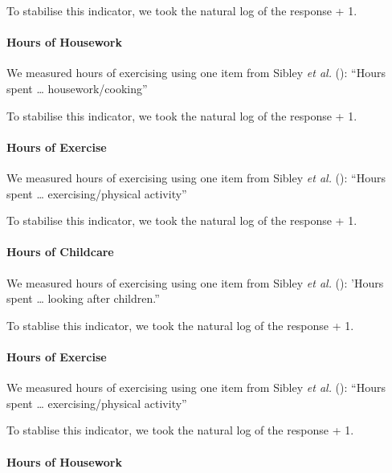\documentclass[
  singlecolumn]{article}
\let\oldparagraph\paragraph
\renewcommand{\paragraph}[1]{\oldparagraph{#1}\mbox{}}
\begin{document}
To stabilise this indicator, we took the natural log of the response +
1.

\paragraph{Hours of Housework}\label{hours-of-housework}

We measured hours of exercising using one item from Sibley \emph{et al.}
(): ``Hours spent \ldots{}
housework/cooking''

To stabilise this indicator, we took the natural log of the response +
1.

\paragraph{Hours of Exercise}\label{hours-of-exercise}

We measured hours of exercising using one item from Sibley \emph{et al.}
(): ``Hours spent \ldots{}
exercising/physical activity''

To stabilise this indicator, we took the natural log of the response +
1.

\paragraph{Hours of Childcare}\label{hours-of-childcare-1}

We measured hours of exercising using one item from Sibley \emph{et al.}
(): 'Hours spent \ldots{} looking after
children.''

To stablise this indicator, we took the natural log of the response + 1.

\paragraph{Hours of Exercise}\label{hours-of-exercise-1}

We measured hours of exercising using one item from Sibley \emph{et al.}
(): ``Hours spent \ldots{}
exercising/physical activity''

To stablise this indicator, we took the natural log of the response + 1.

\paragraph{Hours of Housework}\label{hours-of-housework-1}
\end{document}
